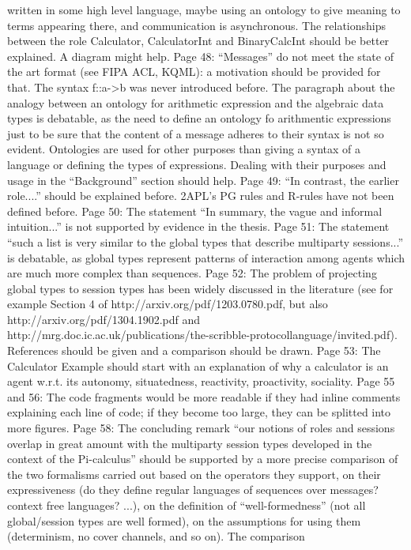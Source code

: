 \documentclass{article}
\newenvironment{them}{\noindent\begingroup\color{blue}}{\endgroup\par}
\begin{document}
\begin{them}
written in some high level language, maybe using an ontology to give meaning to terms appearing
there, and communication is asynchronous.
The relationships between the role Calculator, CalculatorInt and BinaryCalcInt should be better
explained. A diagram might help.
Page 48:
“Messages” do not meet the state of the art format (see FIPA ACL, KQML): a motivation should be
provided for that.
The syntax f::a->b was never introduced before.
The paragraph about the analogy between an ontology for arithmetic expression and the algebraic
data types is debatable, as the need to define an ontology fo arithmentic expressions just to be sure
that the content of a message adheres to their syntax is not so evident. Ontologies are used for other
purposes than giving a syntax of a language or defining the types of expressions. Dealing with their
purposes and usage in the “Background” section should help.
Page 49:
“In contrast, the earlier role....” should be explained before.
2APL's PG rules and R-rules have not been defined before.
Page 50:
The statement “In summary, the vague and informal intuition...” is not supported by evidence in the
thesis.
Page 51:
The statement “such a list is very similar to the global types that describe multiparty sessions...” is
debatable, as global types represent patterns of interaction among agents which are much more
complex than sequences.
Page 52:
The problem of projecting global types to session types has been widely discussed in the literature
(see for example Section 4 of http://arxiv.org/pdf/1203.0780.pdf, but also
http://arxiv.org/pdf/1304.1902.pdf and http://mrg.doc.ic.ac.uk/publications/the-scribble-protocollanguage/invited.pdf).
References should be given and a comparison should be drawn.
Page 53:
The Calculator Example should start with an explanation of why a calculator is an agent w.r.t. its
autonomy, situatedness, reactivity, proactivity, sociality.
Page 55 and 56:
The code fragments would be more readable if they had inline comments explaining each line of
code; if they become too large, they can be splitted into more figures.
Page 58:
The concluding remark “our notions of roles and sessions overlap in great amount with the
multiparty session types developed in the context of the Pi-calculus” should be supported by a more
precise comparison of the two formalisms carried out based on the operators they support, on their
expressiveness (do they define regular languages of sequences over messages? context free
languages? ...), on the definition of “well-formedness” (not all global/session types are well formed),
on the assumptions for using them (determinism, no cover channels, and so on). The comparison

\end{them}
\end{document}
